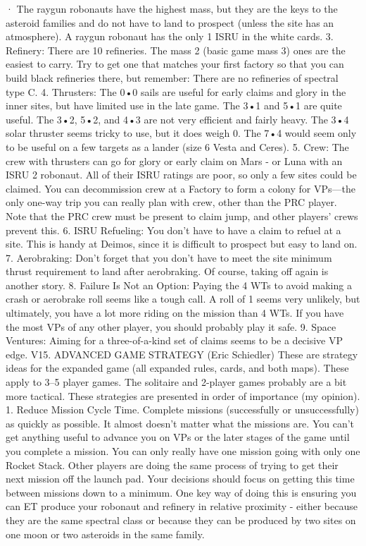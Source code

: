 \documentclass[a4paper]{book}
\begin{document}
·       The raygun robonauts have the highest mass, but they are the keys to the asteroid families and  do not have to land to prospect (unless the site has an atmosphere). A raygun robonaut has the only 1 ISRU in the white cards.
3. Refinery: There are 10 refineries. The mass 2 (basic game mass 3) ones are the easiest to carry. Try to get one that matches your first factory so that you can build black refineries there, but remember: There are no refineries of spectral type C.
4. Thrusters: The 0•0 sails are useful for early claims and glory in the inner sites, but have limited use in the late game. The 3•1 and 5•1 are quite useful. The 3•2, 5•2, and 4•3 are not very efficient and fairly heavy. The 3•4 solar thruster seems tricky to use, but it does weigh 0. The 7•4 would seem only to be useful on a few targets as a lander (size 6 Vesta and Ceres).
5. Crew: The crew with thrusters can go for glory or early claim on Mars - or Luna with an ISRU 2 robonaut. All of their ISRU ratings are poor, so only a few sites could be claimed. You can decommission crew at a Factory to form a colony for VPs—the only one-way trip you can really plan with crew, other than the PRC player. Note that the PRC crew must be present to claim jump, and other players’ crews prevent this.
6. ISRU Refueling: You don't have to have a claim to refuel at a site. This is handy at Deimos, since it is difficult to prospect but easy to land on.
7. Aerobraking: Don't forget that you don't have to meet the site minimum thrust requirement to land after aerobraking. Of course, taking off again is another story.
8. Failure Is Not an Option: Paying the 4 WTs to avoid making a crash or aerobrake roll seems like a tough call. A roll of 1 seems very unlikely, but ultimately, you have a lot more riding on the mission than 4 WTs. If you have the most VPs of any other player, you should probably play it safe.
9. Space Ventures: Aiming for a three-of-a-kind set of claims seems to be a decisive VP edge.
V15. ADVANCED GAME STRATEGY (Eric Schiedler)
These are strategy ideas for the expanded game (all expanded rules, cards, and both maps). These apply to 3–5 player games. The solitaire and 2-player games probably are a bit more tactical.
These strategies are presented in order of importance (my opinion).
1.   Reduce Mission Cycle Time.
Complete missions (successfully or unsuccessfully) as quickly as possible. It almost doesn’t matter what the missions are.
You can't get anything useful to advance you on VPs or the later stages of the game until you complete a mission. You can only really have one mission going with only one Rocket Stack. Other players are doing the same process of trying to get their next mission off the launch pad. Your decisions should focus on getting this time between missions down to a minimum. One key way of doing this is ensuring you can ET produce your robonaut and refinery in relative proximity - either because they are the same spectral class or because they can be produced by two sites on one moon or two asteroids in the same family.
\end{document}
